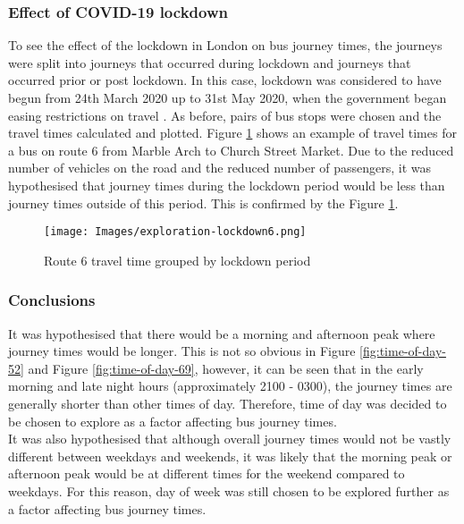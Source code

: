 \subsubsection{Effect of COVID-19 lockdown}

To see the effect of the lockdown in London on bus journey times, the journeys were split into journeys that occurred during lockdown and journeys that occurred prior or post lockdown. In this case, lockdown was considered to have begun from 24th March 2020 up to 31st May 2020, when the government began easing restrictions on travel \cite{lockdown-easing}. As before, pairs of bus stops were chosen and the travel times calculated and plotted. Figure \ref{fig:lockdown6} shows an example of travel times for a bus on route 6 from Marble Arch to Church Street Market. Due to the reduced number of vehicles on the road and the reduced number of passengers, it was hypothesised that journey times during the lockdown period would be less than journey times outside of this period. This is confirmed by the Figure \ref{fig:lockdown6}. 

\begin{figure}[H]
\begin{center}
    \texttt{[image: Images/exploration-lockdown6.png]}
    \caption{Route 6 travel time grouped by lockdown period}
    \label{fig:lockdown6}
\end{center}
\end{figure}

\subsubsection{Conclusions}

It was hypothesised that there would be a morning and afternoon peak where journey times would be longer. This is not so obvious in Figure \ref{fig:time-of-day-52} and Figure \ref{fig:time-of-day-69}, however, it can be seen that in the early morning and late night hours (approximately 2100 - 0300), the journey times are generally shorter than other times of day. Therefore, time of day was decided to be chosen to explore as a factor affecting bus journey times. \\

It was also hypothesised that although overall journey times would not be vastly different between weekdays and weekends, it was likely that the morning peak or afternoon peak would be at different times for the weekend compared to weekdays. For this reason, day of week was still chosen to be explored further as a factor affecting bus journey times. \\

